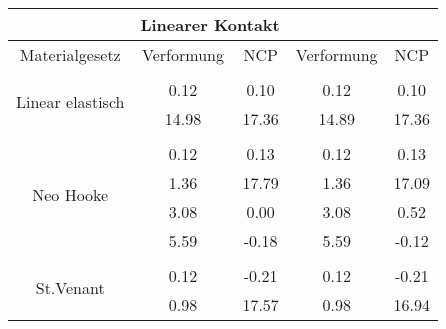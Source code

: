 \begin{table} 
\centering 
\begin{tabular}{c|cc|cc|} 
\cline{2-5} 
 & \multicolumn{2}{|c|}{Linearer Kontakt} &  \\ 
\hline 
\multicolumn{1}{|c|}{Materialgesetz} & \multicolumn{1}{c|}{Verformung} & \multicolumn{1}{c|}{NCP} & \multicolumn{1}{c|}{Verformung} & \multicolumn{1}{c|}{NCP} \\ 
\hline 
\multicolumn{1}{|c|}{\multirow{3}{*}{Linear elastisch}} &\multicolumn{1}{|c|}{} & \multicolumn{1}{|c|}{} & \multicolumn{1}{|c|}{} & \multicolumn{1}{|c|}{} \\ 
\multicolumn{1}{|c|}{} & \multicolumn{1}{|c|}{      0.12} & \multicolumn{1}{|c|}{      0.10} & \multicolumn{1}{|c|}{      0.12} & \multicolumn{1}{|c|}{      0.10} \\ 
\multicolumn{1}{|c|}{} & \multicolumn{1}{|c|}{     14.98} & \multicolumn{1}{|c|}{     17.36} & \multicolumn{1}{|c|}{     14.89} & \multicolumn{1}{|c|}{     17.36} \\ 
\hline 
\multicolumn{1}{|c|}{\multirow{5}{*}{Neo Hooke}} &\multicolumn{1}{|c|}{} & \multicolumn{1}{|c|}{} & \multicolumn{1}{|c|}{} & \multicolumn{1}{|c|}{} \\ 
\multicolumn{1}{|c|}{} & \multicolumn{1}{|c|}{      0.12} & \multicolumn{1}{|c|}{      0.13} & \multicolumn{1}{|c|}{      0.12} & \multicolumn{1}{|c|}{      0.13} \\ 
\multicolumn{1}{|c|}{} & \multicolumn{1}{|c|}{      1.36} & \multicolumn{1}{|c|}{     17.79} & \multicolumn{1}{|c|}{      1.36} & \multicolumn{1}{|c|}{     17.09} \\ 
\multicolumn{1}{|c|}{} & \multicolumn{1}{|c|}{      3.08} & \multicolumn{1}{|c|}{      0.00} & \multicolumn{1}{|c|}{      3.08} & \multicolumn{1}{|c|}{      0.52} \\ 
\multicolumn{1}{|c|}{} & \multicolumn{1}{|c|}{      5.59} & \multicolumn{1}{|c|}{     -0.18} & \multicolumn{1}{|c|}{      5.59} & \multicolumn{1}{|c|}{     -0.12} \\ 
\hline 
\multicolumn{1}{|c|}{\multirow{6}{*}{St.Venant}} &\multicolumn{1}{|c|}{} & \multicolumn{1}{|c|}{} & \multicolumn{1}{|c|}{} & \multicolumn{1}{|c|}{} \\ 
\multicolumn{1}{|c|}{} & \multicolumn{1}{|c|}{      0.12} & \multicolumn{1}{|c|}{     -0.21} & \multicolumn{1}{|c|}{      0.12} & \multicolumn{1}{|c|}{     -0.21} \\ 
\multicolumn{1}{|c|}{} & \multicolumn{1}{|c|}{      0.98} & \multicolumn{1}{|c|}{     17.57} & \multicolumn{1}{|c|}{      0.98} & \multicolumn{1}{|c|}{     16.94} \\ 

\end{tabular}
\end{table}
